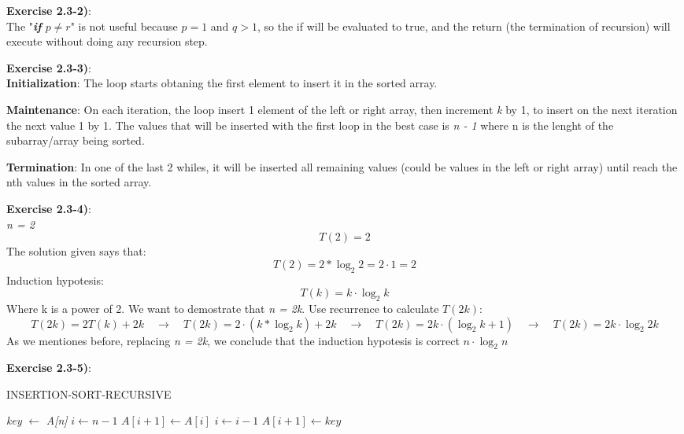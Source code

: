 \documentclass{article}
\newcounter{exercise}[section]   %
\begin{document}
\textbf{Exercise 2.3-2)}:\\
The "\textit{\textbf{if} \(p \neq r\)}" is not useful because \(p = 1\) and \(q > 1\), so the if
will be evaluated to true, and the return (the termination of recursion) will execute without
doing any recursion step.

\textbf{Exercise 2.3-3)}:\\
\textbf{Initialization}: The loop starts obtaning the first element to insert it in the 
sorted array.

\textbf{Maintenance}: On each iteration, the loop insert 1 element of the left or right array,
then increment \textit{k} by 1, to insert on the next iteration the next value 1 by 1. The values
that will be inserted with the first loop in the best case is \textit{n - 1} where n is the
lenght of the subarray/array being sorted.

\textbf{Termination}: In one of the last 2 whiles, it will be inserted all remaining values
(could be values in the left or right array) until reach the nth values in the sorted array.

\textbf{Exercise 2.3-4)}:\\
\textit{n = 2}
\[
T(2) = 2
\]
The solution given says that:
\[
T(2) = 2 * \log_2 2 = 2 \cdot 1 = 2
\]
Induction hypotesis:
\[
T(k) = k \cdot \log_2 k
\]
Where k is a power of 2. We want to demostrate that \textit{n = 2k}.
Use recurrence to calculate \(T(2k)\):
\[
T(2k) = 2T(k) + 2k \quad \rightarrow \quad T(2k) = 2 \cdot (k * \log_2 k) + 2k \quad \rightarrow
\quad T(2k) = 2k \cdot (\log_2 k + 1) \quad \rightarrow \quad T(2k) = 2k \cdot \log_2 2k
\]
As we mentiones before, replacing \textit{n = 2k}, we conclude that the induction hypotesis
is correct \textbf{\(n \cdot \log_2 n\)}

\textbf{Exercise 2.3-5)}:\\
\begin{algorithm}
    \caption{INSERTION-SORT-RECURSIVE}\label{InsertionSortRecursiveID}
    \begin{algorithmic}[1]
                \Return
            \EndIf
            \State {}
            \State \textit{key} $\gets$ \textit{A[n]}
            \State $i \gets n - 1$
                \State $A[i + 1] \gets A[i]$
                \State $i \gets i - 1$
            \EndWhile
            \State $A[i + 1] \gets key$
        \EndFunction
    \end{algorithmic}
\end{algorithm}
\end{document}

